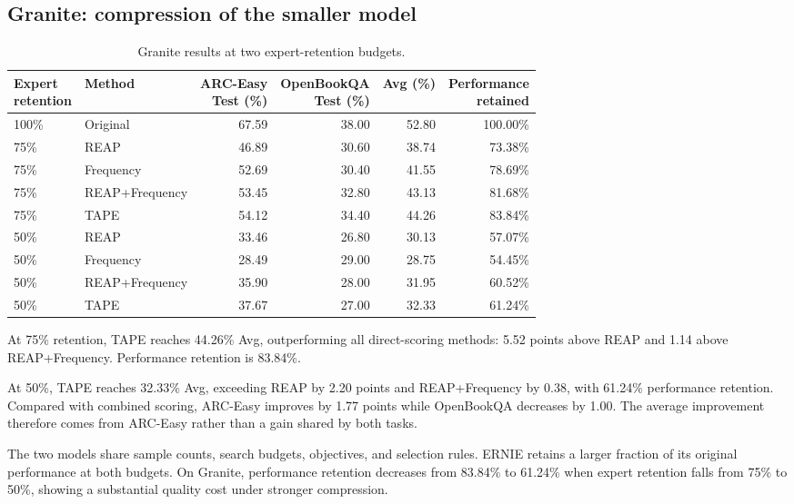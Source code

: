 \documentclass{article}
\begin{document}
\subsection{Granite: compression of the smaller model}
\label{sec:5.2}
\begin{table}[htbp]
\centering\small
\caption{Granite results at two expert-retention budgets.}
\label{tab:granite}
\begin{tabularx}{\linewidth}{@{}lXrrrr@{}}
\toprule
\shortstack{Expert\\retention} & Method & \shortstack{ARC-Easy\\Test (\%)} & \shortstack{OpenBookQA\\Test (\%)} & Avg (\%) & \shortstack{Performance\\retained} \\
\midrule
100\% & Original & 67.59 & 38.00 & 52.80 & 100.00\% \\
\midrule
75\% & REAP & 46.89 & 30.60 & 38.74 & 73.38\% \\
75\% & Frequency & 52.69 & 30.40 & 41.55 & 78.69\% \\
75\% & REAP+Frequency & 53.45 & 32.80 & 43.13 & 81.68\% \\
75\% & TAPE & 54.12 & 34.40 & 44.26 & 83.84\% \\
\midrule
50\% & REAP & 33.46 & 26.80 & 30.13 & 57.07\% \\
50\% & Frequency & 28.49 & 29.00 & 28.75 & 54.45\% \\
50\% & REAP+Frequency & 35.90 & 28.00 & 31.95 & 60.52\% \\
50\% & TAPE & 37.67 & 27.00 & 32.33 & 61.24\% \\
\bottomrule
\end{tabularx}
\end{table}

At 75\% retention, TAPE reaches 44.26\% Avg, outperforming all direct-scoring methods: 5.52 points above REAP and 1.14 above REAP+Frequency. Performance retention is 83.84\%.

At 50\%, TAPE reaches 32.33\% Avg, exceeding REAP by 2.20 points and REAP+Frequency by 0.38, with 61.24\% performance retention. Compared with combined scoring, ARC-Easy improves by 1.77 points while OpenBookQA decreases by 1.00. The average improvement therefore comes from ARC-Easy rather than a gain shared by both tasks.

The two models share sample counts, search budgets, objectives, and selection rules. ERNIE retains a larger fraction of its original performance at both budgets. On Granite, performance retention decreases from 83.84\% to 61.24\% when expert retention falls from 75\% to 50\%, showing a substantial quality cost under stronger compression.
\end{document}
